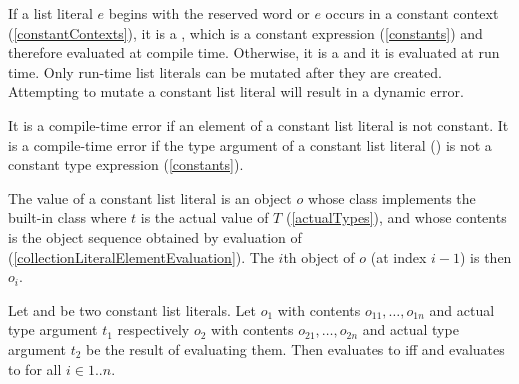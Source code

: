 \documentclass[makeidx]{article}
\begin{document}
{

\LMHash{}%
If a list literal $e$ begins with the reserved word \CONST{}
or $e$ occurs in a constant context
(\ref{constantContexts}),
it is a
,
which is a constant expression
(\ref{constants})
and therefore evaluated at compile time.
Otherwise, it is a
and it is evaluated at run time.
Only run-time list literals can be mutated
after they are created.
Attempting to mutate a constant list literal will result in a dynamic error.


\LMHash{}%
It is a compile-time error
if an element of a constant list literal is not constant.
It is a compile-time error if the type argument of a constant list literal
()
is not a constant type expression
(\ref{constants}).


\LMHash{}%
The value of a constant list literal
is an object $o$ whose class implements the built-in class
where $t$ is the actual value of $T$
(\ref{actualTypes}),
and whose contents is the object sequence  obtained by
evaluation of 
(\ref{collectionLiteralElementEvaluation}).
The $i$th object of $o$ (at index $i - 1$) is then $o_i$.

\LMHash{}%
Let 
and 
be two constant list literals.
Let $o_1$ with contents $o_{11}, \ldots, o_{1n}$ and actual type argument $t_1$
respectively
$o_2$ with contents $o_{21}, \ldots, o_{2n}$ and actual type argument $t_2$
be the result of evaluating them.
Then  evaluates to \TRUE{} if{}f
 and 
evaluates to \TRUE{} for all $i \in 1 .. n$.

}
\end{document}
